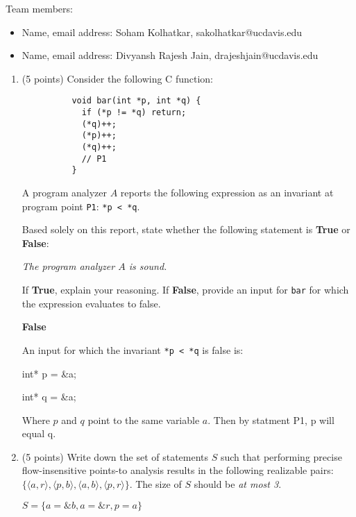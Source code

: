 \documentclass[12pt]{article}
\begin{document}
    \begin{mdframed}
      Team members:
      \begin{itemize}
        \item Name, email address: Soham Kolhatkar, sakolhatkar@ucdavis.edu
        \item Name, email address: Divyansh Rajesh Jain, drajeshjain@ucdavis.edu
      \end{itemize}
    \end{mdframed}
    
    \newpage
    \begin{enumerate}
        \item (5 points) Consider the following C function:
        \begin{lstlisting}
          void bar(int *p, int *q) {
            if (*p != *q) return;
            (*q)++;
            (*p)++;
            (*q)++;
            // P1
          }
        \end{lstlisting}
        A program analyzer $A$ reports the following expression as an invariant
        at program point \lstinline$P1$: \lstinline$*p < *q$.

        Based solely on this report, state whether the following statement is
        \textbf{True} or \textbf{False}: 

        \emph{The program analyzer $A$ is sound.}

        If \textbf{True}, explain your reasoning. If \textbf{False}, provide an
        input for \lstinline$bar$ for which the expression evaluates to false.
         \begin{mdframed}
       
        \textbf{False}

        An input for which the invariant \lstinline$*p < *q$ is false is:
        
        int* p = \&a; 
        
        int* q = \&a;

        Where $p$ and $q$ point to the same variable $a$. Then by statment P1, p will equal q.
        \end{mdframed}

        \item (5 points) Write down the set of statements $S$ such that performing precise flow-insensitive points-to
        analysis results in the following realizable pairs:\\
        $\{\langle a, r\rangle,\langle p, b\rangle,  \langle a, b\rangle, \langle p, r\rangle\}$.
        The size of $S$ should be \emph{at most 3}.
        \begin{mdframed}
          $S = \{ a = \&b  ,  a = \&r  , p = a  \}$
          \end{mdframed}



\end{enumerate}
\end{document}

